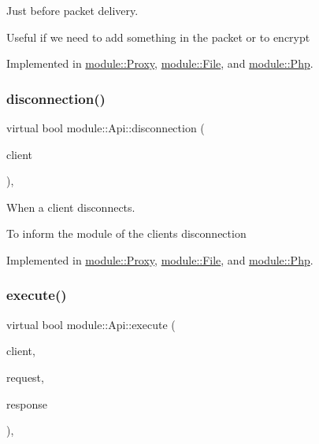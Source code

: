 Just before packet delivery. 

Useful if we need to add something in the packet or to encrypt 

Implemented in \hyperlink{classmodule_1_1Proxy_a314d53ca09edbb7f2595cefb5c55771e}{module\+::\+Proxy}, \hyperlink{classmodule_1_1File_a13091749fbe954576d351e90e15581d7}{module\+::\+File}, and \hyperlink{classmodule_1_1Php_a9ba9768f149e9dbf3094d5cdb4967fc3}{module\+::\+Php}.

\mbox{\label{structmodule_1_1Api_a8aa98bd4094fb13916e100509a948763}} 
\subsubsection{\texorpdfstring{disconnection()}{disconnection()}}
{\footnotesize\ttfamily virtual bool module\+::\+Api\+::disconnection (\begin{DoxyParamCaption}\item[{const \hyperlink{structnet_1_1IClient}{net\+::\+I\+Client} \&}]{client }\end{DoxyParamCaption})\hspace{0.3cm}{\ttfamily [pure virtual]}, {\ttfamily [noexcept]}}



When a client disconnects. 

To inform the module of the client\textquotesingle{}s disconnection 

Implemented in \hyperlink{classmodule_1_1Proxy_aa80f5772c7c4613060f4cf49f1fc00e4}{module\+::\+Proxy}, \hyperlink{classmodule_1_1File_a86bd2e04ae5946fb790342911b9e4454}{module\+::\+File}, and \hyperlink{classmodule_1_1Php_af828a98b73d3da6a53a64d4b3b3927c4}{module\+::\+Php}.

\mbox{\label{structmodule_1_1Api_afd1f5243a90811d06d96f725490bcba6}} 
\subsubsection{\texorpdfstring{execute()}{execute()}}
{\footnotesize\ttfamily virtual bool module\+::\+Api\+::execute (\begin{DoxyParamCaption}\item[{const \hyperlink{structnet_1_1IClient}{net\+::\+I\+Client} \&}]{client,  }\item[{\hyperlink{structhttp_1_1IRequest}{http\+::\+I\+Request} \&}]{request,  }\item[{\hyperlink{structhttp_1_1IResponse}{http\+::\+I\+Response} \&}]{response }\end{DoxyParamCaption})\hspace{0.3cm}{\ttfamily [pure virtual]}, {\ttfamily [noexcept]}}



